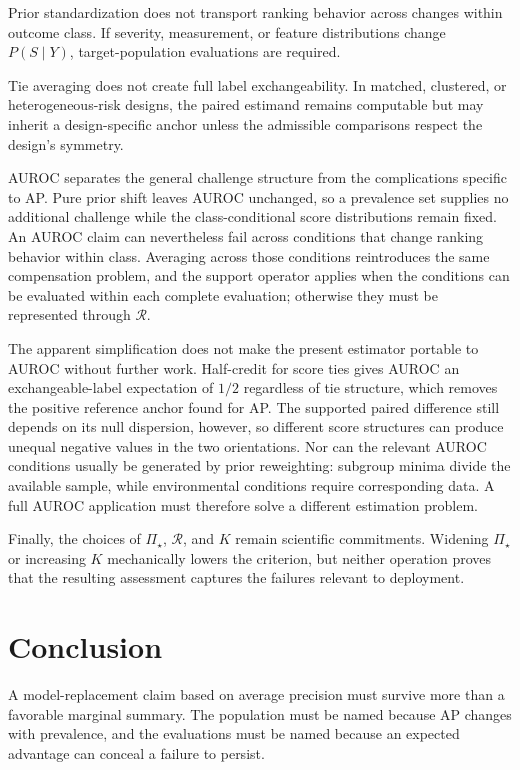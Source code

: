 \documentclass[11pt]{article}
\newcommand{\Regime}{\mathcal{R}}
\newcommand{\PSet}{\Pi_\star}
\theoremstyle{remark}
\begin{document}
Prior standardization does not transport ranking behavior across changes within outcome class. If severity, measurement, or feature distributions change $P(S\mid Y)$, target-population evaluations are required.

Tie averaging does not create full label exchangeability. In matched, clustered, or heterogeneous-risk designs, the paired estimand remains computable but may inherit a design-specific anchor unless the admissible comparisons respect the design's symmetry.

AUROC separates the general challenge structure from the complications specific to AP. Pure prior shift leaves AUROC unchanged, so a prevalence set supplies no additional challenge while the class-conditional score distributions remain fixed. An AUROC claim can nevertheless fail across conditions that change ranking behavior within class. Averaging across those conditions reintroduces the same compensation problem, and the support operator applies when the conditions can be evaluated within each complete evaluation; otherwise they must be represented through $\Regime$.

The apparent simplification does not make the present estimator portable to AUROC without further work. Half-credit for score ties gives AUROC an exchangeable-label expectation of $1/2$ regardless of tie structure, which removes the positive reference anchor found for AP. The supported paired difference still depends on its null dispersion, however, so different score structures can produce unequal negative values in the two orientations. Nor can the relevant AUROC conditions usually be generated by prior reweighting: subgroup minima divide the available sample, while environmental conditions require corresponding data. A full AUROC application must therefore solve a different estimation problem.

Finally, the choices of $\PSet$, $\Regime$, and $K$ remain scientific commitments. Widening $\PSet$ or increasing $K$ mechanically lowers the criterion, but neither operation proves that the resulting assessment captures the failures relevant to deployment.

\section{Conclusion}

A model-replacement claim based on average precision must survive more than a favorable marginal summary. The population must be named because AP changes with prevalence, and the evaluations must be named because an expected advantage can conceal a failure to persist.
\end{document}
